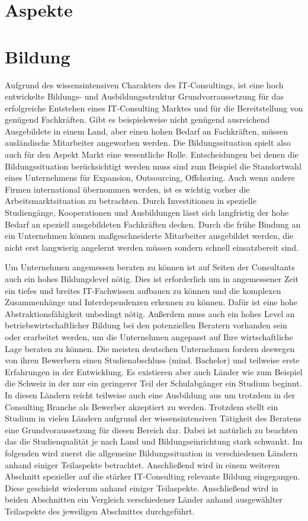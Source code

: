 \chapter{Aspekte}



\chapter{Bildung}
Aufgrund des wissensintensiven Charakters des IT-Consultings, ist eine hoch entwickelte Bildungs- und Ausbildungsstruktur Grundvorraussetzung für das erfolgreiche Entstehen eines IT-Consulting Marktes und für die Bereitstellung von genügend Fachkräften.
Gibt es beispielsweise nicht genügend ausreichend Ausgebildete in einem Land, aber einen hohen Bedarf an Fachkräften, müssen ausländische Mitarbeiter angeworben werden. Die Bildungssituation spielt also auch für den Aspekt Markt eine wesentliche Rolle.
Entscheidungen bei denen die Bildungssituation berücksichtigt werden muss sind zum Beispiel die Standortwahl eines Unternehmens für Expansion, Outsourcing, Offshoring. Auch wenn andere Firmen international übernommen werden, ist es wichtig vorher die Arbeitsmarktsituation zu betrachten. Durch Investitionen in spezielle Studiengänge, Kooperationen und Ausbildungen lässt sich langfristig der hohe Bedarf an speziell ausgebildeten Fachkräften decken. Durch die frühe Bindung an ein Unternehmen können maßgeschneiderte Mitarbeiter ausgebildet werden, die nicht erst langwierig angelernt werden müssen sondern schnell einsatzbereit sind.

Um Unternehmen angemessen beraten zu können ist auf Seiten der Consultants auch ein hohes Bildungslevel nötig. Dies ist erforderlich um in angemessener Zeit ein tiefes und breites IT-Fachwissen aufbauen zu können und die komplexen Zusammenhänge und Interdependenzen erkennen zu können. Dafür ist eine hohe Abstraktionsfähigkeit unbedingt nötig. Außerdem muss auch ein hohes Level an betriebswirtschaftlicher Bildung bei den potenziellen Beratern vorhanden sein oder erarbeitet werden, um die Unternehmen angepasst auf Ihre wirtschaftliche Lage beraten zu können.
Die meisten deutschen Unternehmen fordern deswegen von ihren Bewerbern einen Studienabschluss (mind. Bachelor) und teilweise erste Erfahrungen in der Entwicklung. Es existieren aber auch Länder wie zum Beispiel die Schweiz in der nur ein geringerer Teil der Schulabgänger ein Studium beginnt. In diesen Ländern reicht teilweise auch eine Ausbildung aus um trotzdem in der Consulting Branche als Bewerber akzeptiert zu werden.
Trotzdem stellt ein Studium in vielen Ländern aufgrund der wissensintensiven Tätigkeit des Beratens eine Grundvoraussetzung für diesen Bereich dar. Dabei ist natürlich zu beachten das die Studienqualität je nach Land und Bildungseinrichtung stark schwankt.
Im folgenden wird zuerst die allgemeine Bildungssituation in verschiedenen Ländern anhand einiger Teilaspekte betrachtet. Anschließend wird in einem weiteren Abschnitt spezieller
auf die stärker IT-Consulting relevante Bildung eingegangen. Diese geschieht wiederum anhand einiger Teilaspekte.
Anschließend wird in beiden Abschnitten ein Vergleich verschiedener Länder anhand ausgewählter Teilaspekte des jeweiligen Abschnittes durchgeführt.

